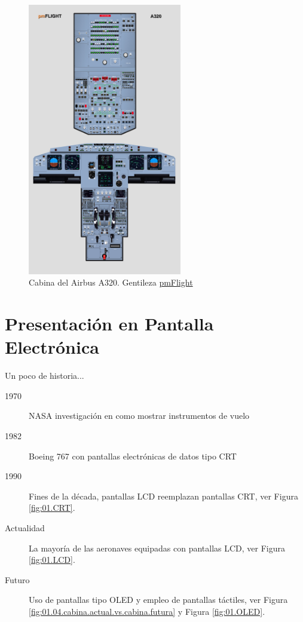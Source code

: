 \begin{figure}[!htb]
  \centering
    \includegraphics[width=0.6\textwidth]{01.tablero.instrumentos/U01.imagenes/1.2.distribucion.normalizada.instrumental.en.tablero/01-free-airbus-a320-poster-HI.jpg}

  \caption{Cabina del Airbus A320. Gentileza \protect\href{https://pmflight.co.uk}{pmFlight}}
  \label{fig:01.cabina.boeing.A320}
\end{figure}




\section{Presentaci\'on en Pantalla Electr\'onica}
\label{sec:presentacion.en.pantalla.electronica}

{Un poco de historia...}


        \begin{description}
        \item[1970] NASA investigaci\'on en como mostrar instrumentos
          de vuelo
        \item[1982]Boeing 767 con pantallas electr\'onicas de datos tipo \ac{CRT}
        \item[1990]Fines de la d\'ecada, pantallas \ac{LCD} reemplazan
          pantallas \ac{CRT}, ver Figura \ref{fig:01.CRT}.
        \item[Actualidad] La mayor\'ia de las aeronaves equipadas con
          pantallas \ac{LCD}, ver Figura \ref{fig:01.LCD}.
        \item[Futuro] Uso de pantallas tipo \ac{OLED} y empleo de pantallas t\'actiles, ver Figura \ref{fig:01.04.cabina.actual.vs.cabina.futura} y Figura \ref{fig:01.OLED}.
        \end{description}

